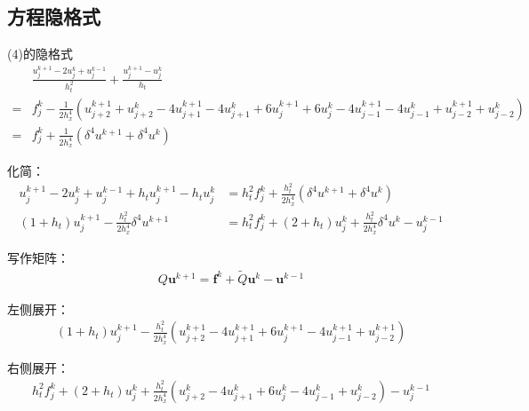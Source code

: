 \documentclass[UTF8]{ctexbook}
\begin{document}
\subsection{方程隐格式}
(4)的隐格式
\begin{align}
    &\frac{u^{k+1}_j-2u^k_j+u^{k-1}_j}{h^2_t}+\frac{u^{k+1}_j-u^k_j}{h_t}\\
    =&f_j^k-\frac{1}{2h^4_x}\left(
        u^{k+1}_{j+2}+u^{k}_{j+2}
        -4u^{k+1}_{j+1}-4u^{k}_{j+1}
        + 6u^{k+1}_j+ 6u^{k}_j 
        - 4u^{k+1}_{j-1} - 4u^{k}_{j-1}
        + u^{k+1}_{j-2}+ u^{k}_{j-2}
        \right)\\
    =&f_j^k+\frac{1}{2h^4_x}\left(\delta^4 u^{k+1}+\delta^4 u^k\right)
\end{align}

化简：
\begin{align}
    u^{k+1}_j-2u^k_j+u^{k-1}_j+h_t u^{k+1}_j-h_t u^k_j &=h^2_t f^k_j+ \frac{h_t^2}{2h^4_x}(\delta^4 u^{k+1}+\delta^4 u^k)\\
    (1+h_t)u^{k+1}_j-\frac{h^2_t}{2h^4_x}\delta^4 u^{k+1}&=
    h^2_t f^k_j+(2+h_t)u^{k}_j+\frac{h^2_t}{2h^4_x}\delta^4 u^{k}-u^{k-1}_j
\end{align}

写作矩阵：
\begin{align}
    Q\mathbf{u}^{k+1}=\mathbf{f}^k+\tilde{Q}\mathbf{u}^k-\mathbf{u}^{k-1}
\end{align}

左侧展开：
\begin{align}
    (1+h_t)u^{k+1}_j -\frac{h_t^2}{2h^4_x}(
        u^{k+1}_{j+2}
    -4u^{k+1}_{j+1}
    + 6u^{k+1}_j
    - 4u^{k+1}_{j-1}
    + u^{k+1}_{j-2})
\end{align}

右侧展开：
\begin{align}
    h^2_t f^k_j+(2+h_t)u^{k}_j+\frac{h^2_t}{2h^4_x}(        
    u^{k}_{j+2}
    -4u^{k}_{j+1}
    + 6u^{k}_j
    - 4u^{k}_{j-1}
    + u^{k}_{j-2})-u^{k-1}_j
\end{align}
\end{document}
